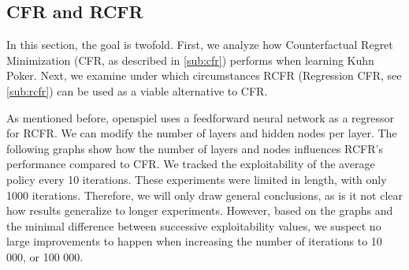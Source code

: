 \documentclass[10pt,a4paper]{article}
\begin{document}
\subsection{CFR and RCFR}

In this section, the goal is twofold. First, we analyze how Counterfactual Regret Minimization (CFR, as described in \ref{sub:cfr}) performs when learning Kuhn Poker. Next, we examine under which circumstances RCFR (Regression CFR, see \ref{sub:rcfr}) can be used as a viable alternative to CFR.

As mentioned before, openspiel uses a feedforward neural network as a regressor for RCFR. We can modify the number of layers and hidden nodes per layer. The following graphs show how the number of layers and nodes influences RCFR's performance compared to CFR. We tracked the exploitability of the average policy every 10 iterations. These experiments were limited in length, with only 1000 iterations. Therefore, we will only draw general conclusions, as is it not clear how results generalize to longer experiments. However, based on the graphs and the minimal difference between successive exploitability values, we suspect no large improvements to happen when increasing the number of iterations to 10 000, or 100 000.
 
\end{document}
